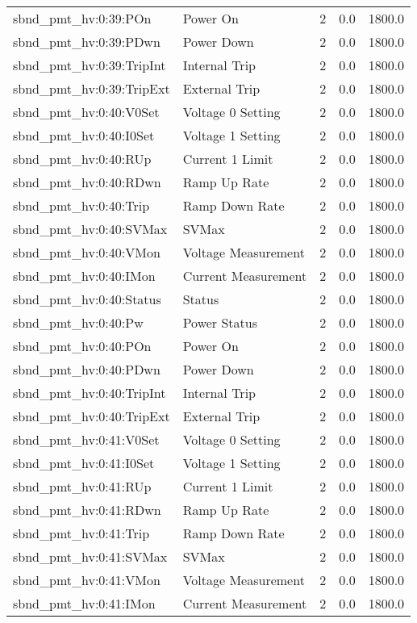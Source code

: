 \begin{center}
\begin{longtable}{l | l l l l }
sbnd\_pmt\_hv:0:39:POn & Power On & 2 & 0.0 & 1800.0\\ 
sbnd\_pmt\_hv:0:39:PDwn & Power Down & 2 & 0.0 & 1800.0\\ 
sbnd\_pmt\_hv:0:39:TripInt & Internal Trip & 2 & 0.0 & 1800.0\\ 
sbnd\_pmt\_hv:0:39:TripExt & External Trip & 2 & 0.0 & 1800.0\\ 
sbnd\_pmt\_hv:0:40:V0Set & Voltage 0 Setting & 2 & 0.0 & 1800.0\\ 
sbnd\_pmt\_hv:0:40:I0Set & Voltage 1 Setting & 2 & 0.0 & 1800.0\\ 
sbnd\_pmt\_hv:0:40:RUp & Current 1 Limit & 2 & 0.0 & 1800.0\\ 
sbnd\_pmt\_hv:0:40:RDwn & Ramp Up Rate & 2 & 0.0 & 1800.0\\ 
sbnd\_pmt\_hv:0:40:Trip & Ramp Down Rate & 2 & 0.0 & 1800.0\\ 
sbnd\_pmt\_hv:0:40:SVMax & SVMax & 2 & 0.0 & 1800.0\\ 
sbnd\_pmt\_hv:0:40:VMon & Voltage Measurement & 2 & 0.0 & 1800.0\\ 
sbnd\_pmt\_hv:0:40:IMon & Current Measurement & 2 & 0.0 & 1800.0\\ 
sbnd\_pmt\_hv:0:40:Status & Status & 2 & 0.0 & 1800.0\\ 
sbnd\_pmt\_hv:0:40:Pw & Power Status & 2 & 0.0 & 1800.0\\ 
sbnd\_pmt\_hv:0:40:POn & Power On & 2 & 0.0 & 1800.0\\ 
sbnd\_pmt\_hv:0:40:PDwn & Power Down & 2 & 0.0 & 1800.0\\ 
sbnd\_pmt\_hv:0:40:TripInt & Internal Trip & 2 & 0.0 & 1800.0\\ 
sbnd\_pmt\_hv:0:40:TripExt & External Trip & 2 & 0.0 & 1800.0\\ 
sbnd\_pmt\_hv:0:41:V0Set & Voltage 0 Setting & 2 & 0.0 & 1800.0\\ 
sbnd\_pmt\_hv:0:41:I0Set & Voltage 1 Setting & 2 & 0.0 & 1800.0\\ 
sbnd\_pmt\_hv:0:41:RUp & Current 1 Limit & 2 & 0.0 & 1800.0\\ 
sbnd\_pmt\_hv:0:41:RDwn & Ramp Up Rate & 2 & 0.0 & 1800.0\\ 
sbnd\_pmt\_hv:0:41:Trip & Ramp Down Rate & 2 & 0.0 & 1800.0\\ 
sbnd\_pmt\_hv:0:41:SVMax & SVMax & 2 & 0.0 & 1800.0\\ 
sbnd\_pmt\_hv:0:41:VMon & Voltage Measurement & 2 & 0.0 & 1800.0\\ 
sbnd\_pmt\_hv:0:41:IMon & Current Measurement & 2 & 0.0 & 1800.0\\ 

\end{longtable}
\end{center}
